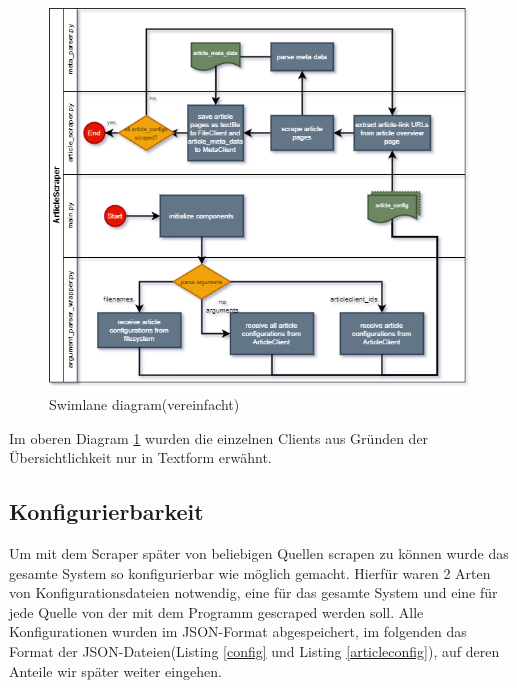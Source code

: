 \documentclass[12pt,oneside,a4paper,parskip]{scrbook}
\begin{document}
\begin{figure}[h!]
\caption{Swimlane diagram(vereinfacht)}
\label{articlescraperswimlanediag}
\centering
\includegraphics[scale=0.6]{article_scraper_swimlane_diagram.png}
\end{figure}
Im oberen Diagram \ref{articlescraperswimlanediag} wurden die einzelnen Clients aus Gründen der Übersichtlichkeit nur in Textform erwähnt.
\pagebreak


\subsection{Konfigurierbarkeit}
Um mit dem Scraper später von beliebigen Quellen scrapen zu können wurde das gesamte System so konfigurierbar wie möglich gemacht. Hierfür waren 2 Arten von Konfigurationsdateien notwendig, eine für das gesamte System und eine für jede Quelle von der mit dem Programm gescraped werden soll. Alle Konfigurationen wurden im JSON-Format abgespeichert, im folgenden das Format der JSON-Dateien(Listing \ref{config} und Listing \ref{articleconfig}), auf deren Anteile wir später weiter eingehen.
\end{document}
